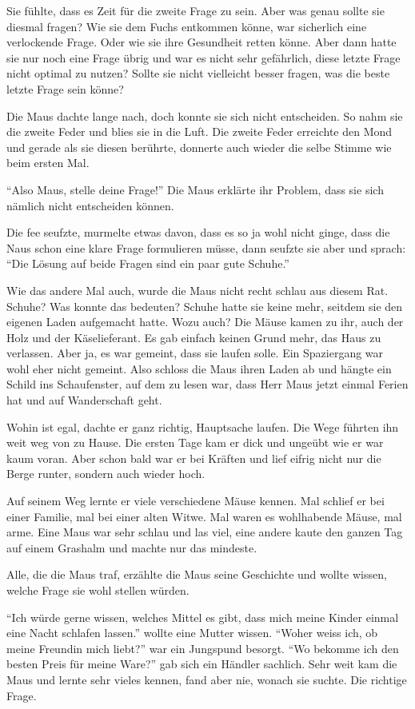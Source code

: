 Sie fühlte, dass es Zeit für die zweite Frage zu sein. Aber was genau sollte sie diesmal fragen? Wie sie dem Fuchs entkommen könne, war sicherlich eine verlockende Frage. Oder wie sie ihre Gesundheit retten könne. Aber dann hatte sie nur noch eine Frage übrig und war es nicht sehr gefährlich, diese letzte Frage nicht optimal zu nutzen? Sollte sie nicht vielleicht besser fragen, was die beste letzte Frage sein könne?

Die Maus dachte lange nach, doch konnte sie sich nicht entscheiden. So nahm sie die zweite Feder und blies sie in die Luft. Die zweite Feder erreichte den Mond und gerade als sie diesen berührte, donnerte auch wieder die selbe Stimme wie beim ersten Mal.

\enquote{Also Maus, stelle deine Frage!} Die Maus erklärte ihr Problem, dass sie sich nämlich nicht entscheiden können.

Die fee seufzte, murmelte etwas davon, dass es so ja wohl nicht ginge, dass die Naus schon eine klare Frage formulieren müsse, dann seufzte sie aber und sprach: \enquote{Die Lösung auf beide Fragen sind ein paar gute Schuhe.}

Wie das andere Mal auch, wurde die Maus nicht recht schlau aus diesem Rat. Schuhe? Was konnte das bedeuten? Schuhe hatte sie keine mehr, seitdem sie den eigenen Laden aufgemacht hatte. Wozu auch? Die Mäuse kamen zu ihr, auch der Holz und der Käselieferant. Es gab einfach keinen Grund mehr, das Haus zu verlassen. Aber ja, es war gemeint, dass sie laufen solle. Ein Spaziergang war wohl eher nicht gemeint. Also schloss die Maus ihren Laden ab und hängte ein Schild ins Schaufenster, auf dem zu lesen war, dass Herr Maus jetzt einmal Ferien hat und auf Wanderschaft geht.

Wohin ist egal, dachte er ganz richtig, Hauptsache laufen. Die Wege führten ihn weit weg von zu Hause. Die ersten Tage kam er dick und ungeübt wie er war kaum voran. Aber schon bald war er bei Kräften und lief eifrig nicht nur die Berge runter, sondern auch wieder hoch.

Auf seinem Weg lernte er viele verschiedene Mäuse kennen. Mal schlief er bei einer Familie, mal bei einer alten Witwe. Mal waren es wohlhabende Mäuse, mal arme. Eine Maus war sehr schlau und las viel, eine andere kaute den ganzen Tag auf einem Grashalm und machte nur das mindeste.

Alle, die die Maus traf, erzählte die Maus seine Geschichte und wollte wissen, welche Frage sie wohl stellen würden.

\enquote{Ich würde gerne wissen, welches Mittel es gibt, dass mich meine Kinder einmal eine Nacht schlafen lassen.} wollte eine Mutter wissen. \enquote{Woher weiss ich, ob meine Freundin mich liebt?} war ein Jungspund besorgt. \enquote{Wo bekomme ich den besten Preis für meine Ware?} gab sich ein Händler sachlich. Sehr weit kam die Maus und lernte sehr vieles kennen, fand aber nie, wonach sie suchte. Die richtige Frage.

